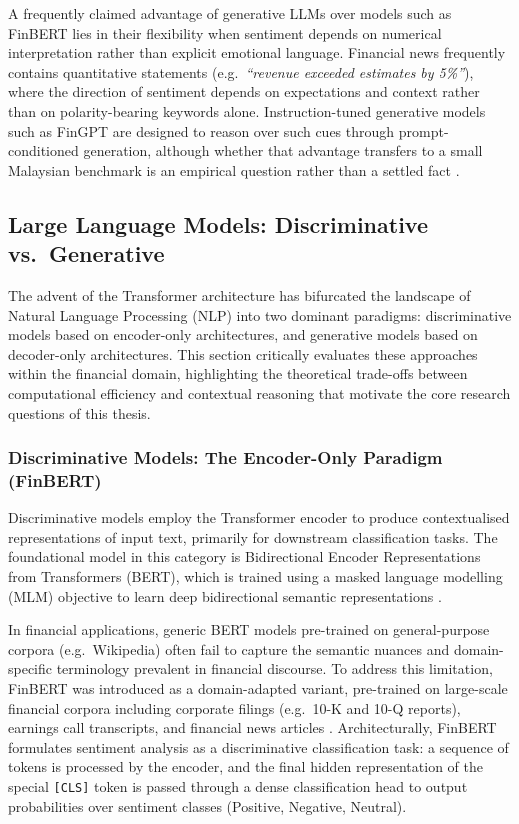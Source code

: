 \documentclass[12pt]{ucetd}
\begin{document}
A frequently claimed advantage of generative LLMs over models such as FinBERT lies in their flexibility when sentiment depends on numerical interpretation rather than explicit emotional language. Financial news frequently contains quantitative statements (e.g.\ \emph{``revenue exceeded estimates by 5\%''}), where the direction of sentiment depends on expectations and context rather than on polarity-bearing keywords alone. Instruction-tuned generative models such as FinGPT are designed to reason over such cues through prompt-conditioned generation, although whether that advantage transfers to a small Malaysian benchmark is an empirical question rather than a settled fact \cite{wu2023bloomberggpt, yang2023fingpt, shobayo2024innovative, nasiopoulos2025financial}.

\subsection{Large Language Models: Discriminative vs.\ Generative}

The advent of the Transformer architecture has bifurcated the landscape of Natural Language Processing (NLP) into two dominant paradigms: discriminative models based on encoder-only architectures, and generative models based on decoder-only architectures. This section critically evaluates these approaches within the financial domain, highlighting the theoretical trade-offs between computational efficiency and contextual reasoning that motivate the core research questions of this thesis.

\subsubsection{Discriminative Models: The Encoder-Only Paradigm (FinBERT)}

Discriminative models employ the Transformer encoder to produce contextualised representations of input text, primarily for downstream classification tasks. The foundational model in this category is Bidirectional Encoder Representations from Transformers (BERT), which is trained using a masked language modelling (MLM) objective to learn deep bidirectional semantic representations \cite{devlin2019bert}.

In financial applications, generic BERT models pre-trained on general-purpose corpora (e.g.\ Wikipedia) often fail to capture the semantic nuances and domain-specific terminology prevalent in financial discourse. To address this limitation, FinBERT was introduced as a domain-adapted variant, pre-trained on large-scale financial corpora including corporate filings (e.g.\ 10-K and 10-Q reports), earnings call transcripts, and financial news articles \cite{araci2019finbert, yang2020finbert}. Architecturally, FinBERT formulates sentiment analysis as a discriminative classification task: a sequence of tokens is processed by the encoder, and the final hidden representation of the special \texttt{[CLS]} token is passed through a dense classification head to output probabilities over sentiment classes (Positive, Negative, Neutral).
\end{document}
